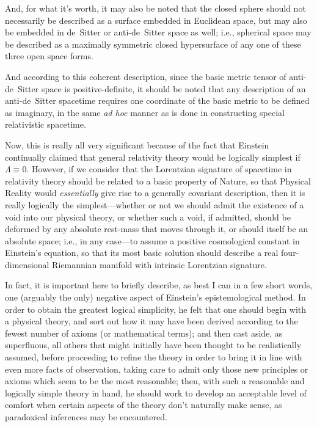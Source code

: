 And, for what it's worth, it may also be noted that the closed sphere should not necessarily be described as a surface embedded in Euclidean space, but may also be embedded in de~Sitter or anti-de~Sitter space as well; i.e., spherical space may be described as a maximally symmetric closed hypersurface of any one of these three open space forms.

And according to this coherent description, since the basic metric tensor of anti-de~Sitter space is positive-definite, it should be noted that any description of an anti-de~Sitter spacetime requires one coordinate of the basic metric to be defined as imaginary, in the same \textit{ad hoc} manner as is done in constructing special relativistic spacetime.

Now, this is really all very significant because of the fact that Einstein continually claimed that general relativity theory would be logically simplest if $\Lambda\equiv0$. However, if we consider that the Lorentzian signature of spacetime in relativity theory should be related to a basic property of Nature, so that Physical Reality would \textit{essentially} give rise to a generally covariant description, then it is really logically the simplest---whether or not we should admit the existence of a void into our physical theory, or whether such a void, if admitted, should be deformed by any absolute rest-mass that moves through it, or should itself be an absolute space; i.e., in any case---to assume a positive cosmological constant in Einstein's equation, so that its most basic solution should describe a real four-dimensional Riemannian manifold with intrinsic Lorentzian signature.

In fact, it is important here to briefly describe, as best I can in a few short words, one (arguably the only) negative aspect of Einstein's epistemological method. In order to obtain the greatest logical simplicity, he felt that one should begin with a physical theory, and sort out how it may have been derived according to the fewest number of axioms (or mathematical terms); and then cast aside, as superfluous, all others that might initially have been thought to be realistically assumed, before proceeding to refine the theory in order to bring it in line with even more facts of observation, taking care to admit only those new principles or axioms which seem to be the most reasonable; then, with such a reasonable and logically simple theory in hand, he should work to develop an acceptable level of comfort when certain aspects of the theory don't naturally make sense, as paradoxical inferences may be encountered.

